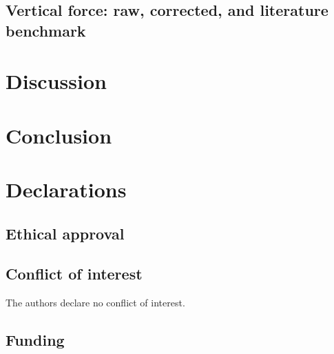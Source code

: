 \documentclass[times,sagev]{sagej}
\begin{document}
\subsection{Vertical force: raw, corrected, and literature benchmark}

\section{Discussion}

\section{Conclusion}

\section*{Declarations}

\subsection*{Ethical approval}

\subsection*{Conflict of interest}
The authors declare no conflict of interest. %

\subsection*{Funding}
\end{document}
